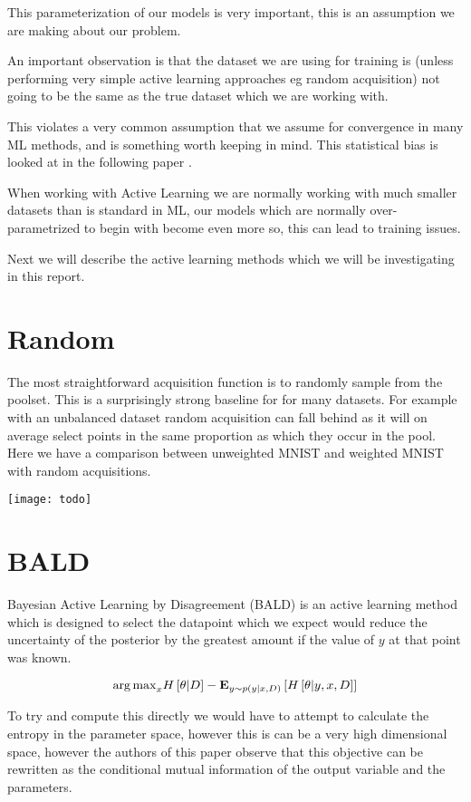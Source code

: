 \documentclass[12pt, a4paper]{report}
\theoremstyle{definition}
\theoremstyle{definition}
\theoremstyle{definition}
\begin{document}
This parameterization of our models is very important, this is an assumption we are making about our problem.

An important observation is that the dataset we are using for training is (unless performing very simple active learning approaches eg random acquisition) not going to be the same as the true dataset which we are working with. 

This violates a very common assumption that we assume for convergence in many ML methods, and is something worth keeping in mind. This statistical bias is looked at in the following paper \cite{farquhar2021statistical}.

When working with Active Learning we are normally working with much smaller datasets than is standard in ML, our models which are normally over-parametrized to begin with become even more so, this can lead to training issues.

Next we will describe the active learning methods which we will be investigating in this report.

\section{Random}

The most straightforward acquisition function is to randomly sample from the poolset. This is a surprisingly strong baseline for for many datasets. For example with an unbalanced dataset random acquisition can fall behind as it will on average select points in the same proportion as which they occur in the pool. Here we have a comparison between unweighted MNIST and weighted MNIST with random acquisitions.

\texttt{[image: todo]}


\section{BALD}
Bayesian Active Learning by Disagreement (BALD) \cite{houlsby2011bayesian} is an active learning method which is designed to select the datapoint which we expect would reduce the uncertainty of the posterior by the greatest amount if the value of $y$ at that point was known.


$${\operatorname*{arg\,max}}_x H \left[ \theta | D \right] - \mathbf{E}_{y \sim p(y | x, D)} \left[ H\left[ \theta | y, x, D\right]\right]$$

To try and compute this directly we would have to attempt to calculate the entropy in the parameter space, however this is can be a very high dimensional space, however the authors of this paper observe that this objective can be rewritten as the conditional mutual information of the output variable and the parameters.
\end{document}

